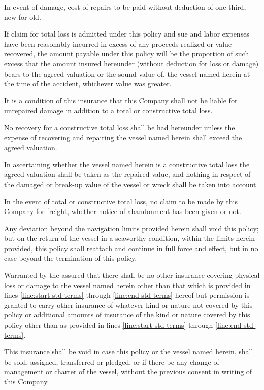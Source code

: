 \documentclass[10pt]{article}
\begin{document}
\begin{linenumbers}
In event of damage, cost of repairs to be paid without deduction of one-third, new for old. 

If claim  for total loss is admitted under this policy and sue and labor expenses have been reasonably incurred in excess  of  any  proceeds  realized  or  value  recovered,  the  amount  payable  under  this  policy  will  be  the  proportion  of such  excess  that  the  amount  insured  hereunder (without  deduction  for  loss  or  damage)  bears  to  the  agreed  valuation or the sound value of, the vessel named herein at the time of the accident, whichever value was greater.  

It  is  a  condition  of  this  insurance  that  this  Company  shall  not  be  liable  for  unrepaired  damage  in  addition to a total or constructive total loss. 

No recovery for a constructive total loss shall be had hereunder unless the expense of recovering and repairing the vessel named herein shall exceed the agreed valuation. 

In  ascertaining  whether  the  vessel  named  herein  is  a  constructive  total  loss  the  agreed  valuation  shall  be taken  as  the  repaired  value,  and  nothing  in  respect  of  the  damaged  or  break-up  value  of  the  vessel  or  wreck  shall be taken into account.

In  the  event  of  total  or  constructive  total  loss,  no  claim  to  be  made  by  this  Company  for  freight,  whether notice of abandonment has been given or not. 

Any  deviation  beyond  the  navigation  limits  provided  herein  shall  void  this  policy;  but  on  the  return  of  the vessel  in  a  seaworthy  condition,  within  the  limits  herein  provided,  this  policy  shall  reattach  and  continue  in  full force and effect, but in no case beyond the termination of this policy.

Warranted by the assured that there shall   be   no   other   insurance   covering   physical   loss   or   damage   to   the vessel  named  herein  other  than  that  which  is  provided  in  lines \ref{line:start-std-terms} through \ref{line:end-std-terms} hereof  but  permission  is granted to  carry  other  insurance  of  whatever  kind  or  nature  not  covered  by  this  policy  or  additional  amounts  of  insurance of the kind or nature covered by this policy other than as provided in lines \ref{line:start-std-terms} through \ref{line:end-std-terms}.

This  insurance  shall  be  void  in  case  this  policy  or  the  vessel  named  herein,  shall  be  sold,  assigned,  transferred or  pledged,  or  if  there  be  any  change  of  management  or  charter  of  the  vessel,  without  the  previous  consent  in writing of this Company.


\end{linenumbers}
\end{document}

